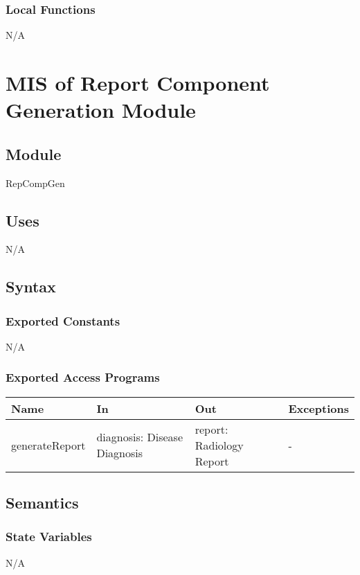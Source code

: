 \documentclass[12pt, titlepage]{article}
\begin{document}
\subsubsection{Local Functions}
N/A

\newpage

\section{MIS of Report Component Generation Module} \label{mRepCompGen}

\subsection{Module}
RepCompGen

\subsection{Uses}
N/A

\subsection{Syntax}

\subsubsection{Exported Constants}
N/A

\subsubsection{Exported Access Programs}

\begin{center}
    \begin{tabular}{p{3cm} p{3.5cm} p{5cm} p{3cm}}
      \hline
      \textbf{Name} & \textbf{In} & \textbf{Out} & \textbf{Exceptions} \\
      \hline
      generateReport & diagnosis: Disease Diagnosis & report: Radiology Report
        & - \\
      \hline
    \end{tabular}
\end{center}

\subsection{Semantics}

\subsubsection{State Variables}
N/A
\end{document}
